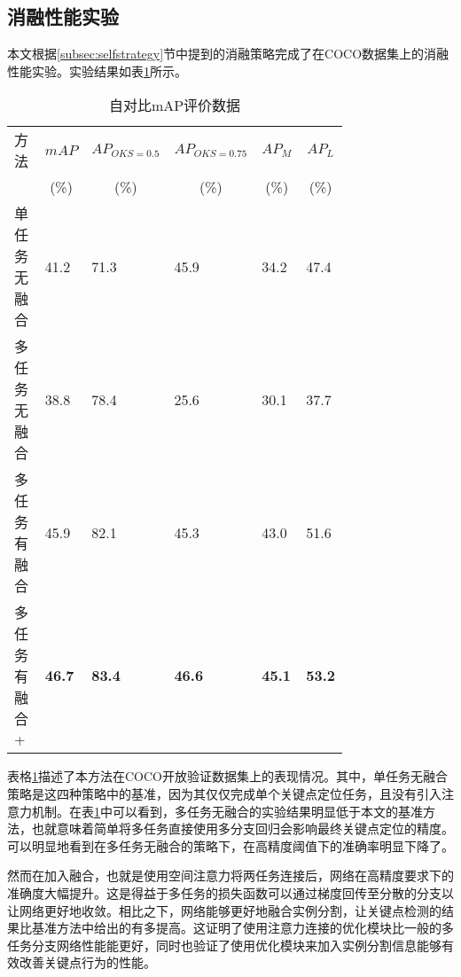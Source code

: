 \subsection{消融性能实验}
\label{subsec:selfeval}

本文根据\ref{subsec:selfstrategy}节中提到的消融策略完成了在COCO数据集上的消融性能实验。实验结果如表\ref{tab:mAPCOCOselfbenchmark}所示。

\begin{table}[ht]
	\centering
	\caption{自对比mAP评价数据}
	\label{tab:mAPCOCOselfbenchmark}
	\begin{minipage}{0.8\linewidth}
		\begin{tabular}{p{0.25\linewidth}p{0.1\linewidth}<{\centering}p{0.1\linewidth}<{\centering}p{0.1\linewidth}<{\centering}p{0.1\linewidth}<{\centering}p{0.1\linewidth}<{\centering}}
			\hline
			方法 & \multicolumn{1}{c}{$mAP$} & \multicolumn{1}{c}{$AP_{OKS=0.5}$} & \multicolumn{1}{c}{$AP_{OKS=0.75}$} 
			& \multicolumn{1}{c}{$AP_M$} & \multicolumn{1}{c}{$AP_L$} \\
			
			& \multicolumn{1}{c}{(\%)}& \multicolumn{1}{c}{(\%)}&
			\multicolumn{1}{c}{(\%)}& \multicolumn{1}{c}{(\%)}& \multicolumn{1}{c}{
				(\%)}\\
			\hline
			单任务无融合 & 41.2 & 71.3 & 45.9& 34.2& 47.4\\
			多任务无融合 & 38.8 & 78.4 & 25.6 & 30.1 & 37.7 \\
			多任务有融合 & 45.9 & 82.1 & 45.3 & 43.0 & 51.6 \\
			多任务有融合+ & \textbf{46.7} & \textbf{83.4} & \textbf{46.6} & \textbf{45.1} & \textbf{53.2} \\
			\hline
		\end{tabular}
	\end{minipage}
\end{table}

表格\ref{tab:mAPCOCOselfbenchmark}描述了本方法在COCO开放验证数据集上的表现情况。其中，单任务无融合策略是这四种策略中的基准，因为其仅仅完成单个关键点定位任务，且没有引入注意力机制。在表\ref{tab:mAPCOCOselfbenchmark}中可以看到，多任务无融合的实验结果明显低于本文的基准方法，也就意味着简单将多任务直接使用多分支回归会影响最终关键点定位的精度。可以明显地看到在多任务无融合的策略下，在高精度阈值下的准确率明显下降了。

然而在加入融合，也就是使用空间注意力将两任务连接后，网络在高精度要求下的准确度大幅提升。这是得益于多任务的损失函数可以通过梯度回传至分散的分支以让网络更好地收敛。相比之下，网络能够更好地融合实例分割，让关键点检测的结果比基准方法中给出的有多提高。这证明了使用注意力连接的优化模块比一般的多任务分支网络性能能更好，同时也验证了使用优化模块来加入实例分割信息能够有效改善关键点行为的性能。

